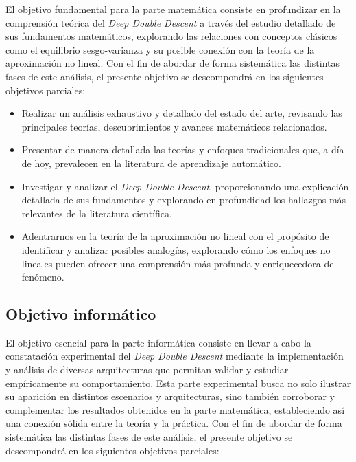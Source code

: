 El objetivo fundamental para la parte matemática consiste en profundizar en la comprensión teórica del \textit{Deep Double Descent} a través del estudio detallado de sus fundamentos matemáticos, explorando las relaciones con conceptos clásicos como el equilibrio sesgo-varianza y su posible conexión con la teoría de la aproximación no lineal. Con el fin de abordar de forma sistemática las distintas fases de este análisis, el presente objetivo se descompondrá en los siguientes objetivos parciales:

\begin{itemize}
    \item Realizar un análisis exhaustivo y detallado del estado del arte, revisando las principales teorías, descubrimientos y avances matemáticos relacionados.
    \item Presentar de manera detallada las teorías y enfoques tradicionales que, a día de hoy, prevalecen en la literatura de aprendizaje automático.
    \item Investigar y analizar el \textit{Deep Double Descent}, proporcionando una explicación detallada de sus fundamentos y explorando en profundidad los hallazgos más relevantes de la literatura científica.
    \item Adentrarnos en la teoría de la aproximación no lineal con el propósito de identificar y analizar posibles analogías, explorando cómo los enfoques no lineales pueden ofrecer una comprensión más profunda y enriquecedora del fenómeno.
\end{itemize}

\subsection{Objetivo informático}

El objetivo esencial para la parte informática consiste en llevar a cabo la constatación experimental del \textit{Deep Double Descent} mediante la implementación y análisis de diversas arquitecturas que permitan validar y estudiar empíricamente su comportamiento. Esta parte experimental busca no solo ilustrar su aparición en distintos escenarios y arquitecturas, sino también corroborar y complementar los resultados obtenidos en la parte matemática, estableciendo así una conexión sólida entre la teoría y la práctica. Con el fin de abordar de forma sistemática las distintas fases de este análisis, el presente objetivo se descompondrá en los siguientes objetivos parciales:

